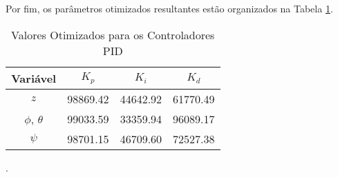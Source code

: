 Por fim, os parâmetros otimizados resultantes estão organizados na Tabela \ref{tab:pid_values}.
\begin{table}[h!]
    \centering
    \caption{Valores Otimizados para os Controladores PID}
    \label{tab:pid_values}
    \begin{tabular}{|c|c|c|c|}
        \hline
        \textbf{Variável} & \textbf{$K_p$} & \textbf{$K_i$} & \textbf{$K_d$} \\ \hline
        $z$              & 98869.42       & 44642.92       & 61770.49       \\ \hline
        $\phi$, $\theta$ & 99033.59       & 33359.94       & 96089.17       \\ \hline
        $\psi$           & 98701.15       & 46709.60       & 72527.38       \\ \hline
    \end{tabular}
\end{table}

.